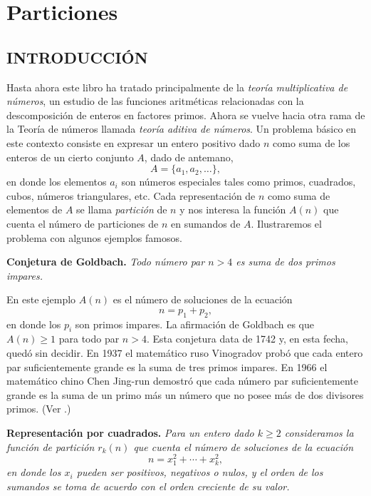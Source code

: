\chapter{Particiones}

    \section{INTRODUCCIÓN}

    Hasta ahora este libro ha tratado principalmente de la \textit{teoría multiplicativa de
    números}, un estudio de las funciones aritméticas relacionadas con la descomposición de
    enteros en factores primos. Ahora se vuelve hacia otra rama de la Teoría de números llamada
    \textit{teoría aditiva de números}. Un problema básico en este contexto consiste en
    expresar un entero positivo dado $n$ como suma de los enteros de un cierto conjunto $A$,
    dado de antemano,
    \begin{equation*}
        A=\{a_1,a_2,\dots\},
    \end{equation*}
    en donde los elementos $a_i$ son números especiales tales como primos, cuadrados, cubos,
    números triangulares, etc. Cada representación de $n$ como suma de elementos de $A$ se
    llama \textit{partición} de $n$ y nos interesa la función $A(n)$ que cuenta el número de
    particiones de $n$ en sumandos de $A$. Ilustraremos el problema con algunos ejemplos
    famosos.

    \textbf{Conjetura de Goldbach.} \textit{Todo número par $n>4$ es suma de dos primos
    impares.}

    En este ejemplo $A(n)$ es el número de soluciones de la ecuación
    \begin{equation}\label{eq:14-1}
        n=p_1+p_2,
    \end{equation}
    en donde los $p_i$ son primos impares. La afirmación de Goldbach es que $A(n)\geq1$ para
    todo par $n>4$. Esta conjetura data de 1742 y, en esta fecha, quedó sin decidir. En 1937 el
    matemático ruso Vinogradov probó que cada entero par suficientemente grande es la suma de
    tres primos impares. En 1966 el matemático chino Chen Jing-run demostró que cada número par
    suficientemente grande es la suma de un primo más un número que no posee más de dos
    divisores primos. (Ver \cite{chen1966}.)

    \textbf{Representación por cuadrados.} \textit{Para un entero dado $k\geq2$ consideramos la
    función de partición $r_k(n)$ que cuenta el número de soluciones de la ecuación}
    \begin{equation}\label{eq:14-2}
        n=x_1^2+\cdots+x_k^2,
    \end{equation}
    \textit{en donde los $x_i$ pueden ser positivos, negativos o nulos, y el orden de los
    sumandos se toma de acuerdo con el orden creciente de su valor.}

